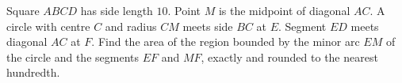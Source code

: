 Square $ABCD$ has side length $10$. Point $M$ is the midpoint of diagonal $AC$. A circle with centre $C$ and radius $CM$ meets side $BC$ at $E$. Segment $ED$ meets diagonal $AC$ at $F$. Find the area of the region bounded by the minor arc $EM$ of the circle and the segments $EF$ and $MF$, exactly and rounded to the nearest hundredth.
